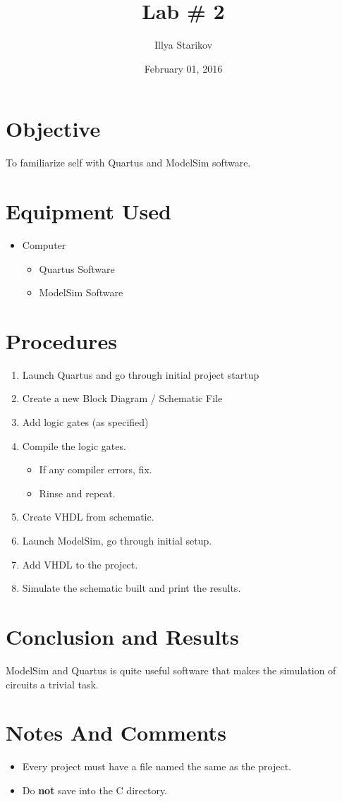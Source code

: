 \documentclass{article}
\begin{document}
\title{Lab \# 2}
\date{February 01, 2016}
\author{Illya Starikov}
\maketitle

\section{Objective}
To familiarize self with Quartus and ModelSim software.

\section{Equipment Used}
\begin{itemize}
\item Computer
    \begin{itemize}
    \item Quartus Software
    \item ModelSim Software
    \end{itemize}
\end{itemize}

\section{Procedures}
\begin{enumerate}
\item Launch Quartus and go through initial project startup
\item Create a new Block Diagram / Schematic File
\item Add logic gates (as specified)
\item Compile the logic gates.
    \begin{itemize}
    \item If any compiler errors, fix.
    \item Rinse and repeat.
    \end{itemize}
\item Create VHDL from schematic.
\item Launch ModelSim, go through initial setup.
\item Add VHDL to the project.
\item Simulate the schematic built and print the results.
\end{enumerate}

\section{Conclusion and Results}
ModelSim and Quartus is quite useful software that makes the simulation of circuits a trivial task.

\section{Notes And Comments}
\begin{itemize}
\item Every project must have a file named the same as the project.
\item Do \textbf{not} save into the C directory.
\end{itemize}
\end{document}

